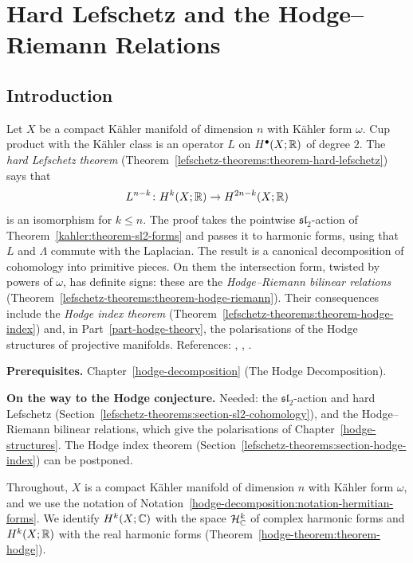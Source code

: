 \chapter{Hard Lefschetz and the Hodge--Riemann Relations}\label{lefschetz-theorems}

\section{Introduction}\label{lefschetz-theorems:section-introduction}

Let $X$ be a compact K\"ahler manifold of dimension $n$ with K\"ahler form $\omega$. Cup product with the K\"ahler class is an operator
$L$ on $H^\bullet(X; \mathbb{R})$ of degree $2$. The \emph{hard Lefschetz theorem}
(Theorem~\ref{lefschetz-theorems:theorem-hard-lefschetz}) says that
\[
L^{n-k} \colon H^k(X; \mathbb{R}) \to H^{2n-k}(X; \mathbb{R})
\]
is an isomorphism for $k \leq n$. The proof takes the pointwise $\mathfrak{sl}_2$-action of Theorem~\ref{kahler:theorem-sl2-forms} and
passes it to harmonic forms, using that $L$ and $\Lambda$ commute with the Laplacian. The result is a canonical decomposition of cohomology
into primitive pieces. On them the intersection form, twisted by powers of $\omega$, has definite signs: these are the
\emph{Hodge--Riemann bilinear relations} (Theorem~\ref{lefschetz-theorems:theorem-hodge-riemann}). Their consequences include the
\emph{Hodge index theorem} (Theorem~\ref{lefschetz-theorems:theorem-hodge-index}) and, in Part~\ref{part-hodge-theory}, the polarisations of
the Hodge structures of projective manifolds. References: \cite[Chapter 0, Section 7]{griffiths-harris}, \cite[Section 3.3]{huybrechts-complex},
\cite[Chapter 6]{voisin-hodge-1}.

\noindent\textbf{Prerequisites.} Chapter~\ref{hodge-decomposition} (The Hodge Decomposition).

\noindent\textbf{On the way to the Hodge conjecture.} Needed: the $\mathfrak{sl}_2$-action and hard Lefschetz (Section~\ref{lefschetz-theorems:section-sl2-cohomology}), and the Hodge--Riemann bilinear relations, which give the
polarisations of Chapter~\ref{hodge-structures}. The Hodge index theorem (Section~\ref{lefschetz-theorems:section-hodge-index}) can be postponed.

Throughout, $X$ is a compact K\"ahler manifold of dimension $n$ with K\"ahler form $\omega$, and we use the notation of
Notation~\ref{hodge-decomposition:notation-hermitian-forms}. We identify $H^k(X; \mathbb{C})$ with the space $\mathcal{H}^k_{\mathbb{C}}$ of complex
harmonic forms and $H^k(X; \mathbb{R})$ with the real harmonic forms (Theorem~\ref{hodge-theorem:theorem-hodge}).

